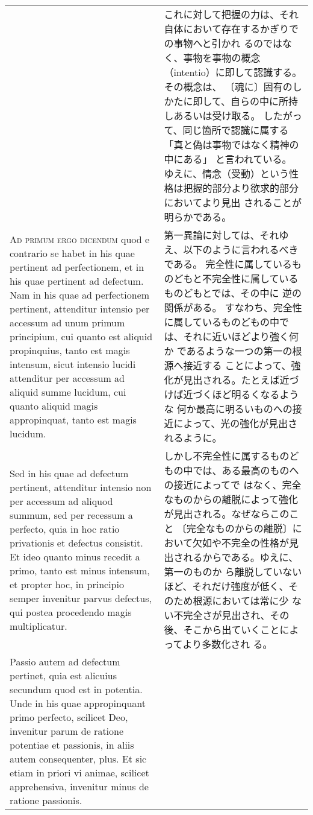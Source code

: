\documentclass[10pt]{jsarticle} %
\begin{document}
\begin{longtable}{p{21em}p{21em}}
&

これに対して把握の力は、それ自体において存在するかぎりでの事物へと引かれ
 るのではなく、事物を事物の概念（intentio）に即して認識する。その概念は、
 〔魂に〕固有のしかたに即して、自らの中に所持しあるいは受け取る。
したがって、同じ箇所で認識に属する「真と偽は事物ではなく精神の中にある」
 と言われている。
ゆえに、情念（受動）という性格は把握的部分より欲求的部分においてより見出
 されることが明らかである。

\\


{\scshape Ad primum ergo dicendum} quod e contrario se habet in his quae pertinent
 ad perfectionem, et in his quae pertinent ad defectum. Nam in his quae
 ad perfectionem pertinent, attenditur intensio per accessum ad unum
 primum principium, cui quanto est aliquid propinquius, tanto est magis
 intensum, sicut intensio lucidi attenditur per accessum ad aliquid
 summe lucidum, cui quanto aliquid magis appropinquat, tanto est magis
 lucidum. 


&

第一異論に対しては、それゆえ、以下のように言われるべきである。
完全性に属しているものどもと不完全性に属しているものどもとでは、その中に
 逆の関係がある。
すなわち、完全性に属しているものどもの中では、それに近いほどより強く何か
 であるような一つの第一の根源へ接近する
ことによって、強化が見出される。たとえば近づけば近づくほど明るくなるような
 何か最高に明るいものへの接近によって、光の強化が見出されるように。


\\

Sed in his quae ad defectum pertinent, attenditur intensio non
 per accessum ad aliquod summum, sed per recessum a perfecto, quia in
 hoc ratio privationis et defectus consistit. Et ideo quanto minus
 recedit a primo, tanto est minus intensum, et propter hoc, in principio
 semper invenitur parvus defectus, qui postea procedendo magis
 multiplicatur. 

&

しかし不完全性に属するものどもの中では、ある最高のものへの接近によってで
 はなく、完全なものからの離脱によって強化が見出される。なぜならこのこと
 〔完全なものからの離脱〕において欠如や不完全の性格が見出されるからである。ゆえに、第一のものか
 ら離脱していないほど、それだけ強度が低く、そのため根源においては常に少
 ない不完全さが見出され、その後、そこから出ていくことによってより多数化され
 る。

\\

Passio autem ad defectum pertinet, quia est alicuius
 secundum quod est in potentia. Unde in his quae appropinquant primo
 perfecto, scilicet Deo, invenitur parum de ratione potentiae et
 passionis, in aliis autem consequenter, plus. Et sic etiam in priori vi
 animae, scilicet apprehensiva, invenitur minus de ratione passionis.


\end{longtable}
\end{document}
